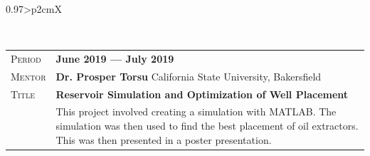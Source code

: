 \documentclass[a4paper, oneside, final]{scrartcl} %
\newcommand{\gray}{\rowcolor[gray]{.90}} %
\begin{document}
\begin{center}
\begin{tabularx}{0.97\linewidth}{>{\raggedleft\scshape}p{2cm}X}
		\end{tabularx}\\
		\vspace*{10pt}
		\begin{tabularx}{0.97\linewidth}{>{\raggedleft\scshape}p{2cm}X}
			\gray Period & \textbf{June 2019 --- July 2019}\\
			\gray Mentor & \textbf{Dr. Prosper Torsu} \hfill California State University, Bakersfield\\
			\gray Title & \textbf{Reservoir Simulation and Optimization of Well Placement}\\
			& This project involved creating a simulation with MATLAB.  The simulation was then used to find the best placement of oil extractors.  This was then presented in a poster presentation.
		\end{tabularx}

\end{center}
\end{document}
